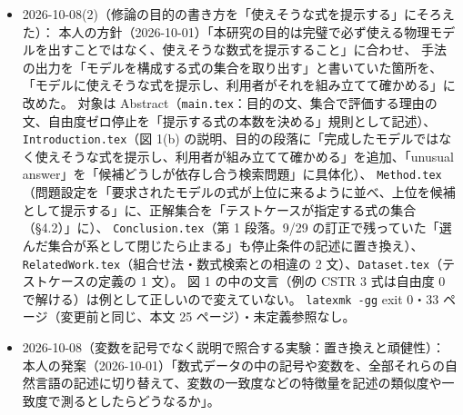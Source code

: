 \documentclass[11pt,a4paper]{jsarticle}
\begin{document}
\begin{itemize}[nosep]
    \S3.1 と表 1 の「必要な式を上位に並べる」$\to$「使える可能性の高い式を上位に並べる」、
    \S3.3 の「求めるのは……集めた式が連立方程式として解けること」$\to$「提示する式が変数でつながり、一緒にモデルに使えること」、
    表 1 の数式検索の行の「連立方程式として解ける式の集合を探す」$\to$「一緒に提示する式との変数のつながりも見て、モデルに使える可能性の高い式を探す」（自由度ゼロ停止は解ける集合を保証しないため）。
    \texttt{latexmk} exit 0・5 ページ（変更前と同じ）・未定義参照なし。配布用 PDF を更新し、Overleaf 用 zip \texttt{docs/seminar\_overleaf\_20261008\_related\_work.zip}
    （4 エントリ：\texttt{.tex}・\texttt{.bib}・\texttt{jresume.cls}・\texttt{latexmkrc}。10-08 の別報告の zip と名前がぶつからないよう報告名を付けた）を作り、展開し直して単体で exit 0・5 ページを確認した。
    作成中の \texttt{progress\_report\_2026-10-08\_var\_description.tex}（別セッションの作業、未追跡）は Abstract の同じ 1 文だけを書き換え、そのセッションに知らせた（コミットはそのセッションに任せる）。
    08-31 以前の報告は発表済みの記録として変えていない。
  \item 2026-10-08(2)（修論の目的の書き方を「使えそうな式を提示する」にそろえた）：
    本人の方針（2026-10-01）「本研究の目的は完璧で必ず使える物理モデルを出すことではなく、使えそうな数式を提示すること」に合わせ、
    手法の出力を「モデルを構成する式の集合を取り出す」と書いていた箇所を、「モデルに使えそうな式を提示し、利用者がそれを組み立てて確かめる」に改めた。
    対象は Abstract（\texttt{main.tex}：目的の文、集合で評価する理由の文、自由度ゼロ停止を「提示する式の本数を決める」規則として記述）、
    \texttt{Introduction.tex}（図 1(b) の説明、目的の段落に「完成したモデルではなく使えそうな式を提示し、利用者が組み立てて確かめる」を追加、「unusual answer」を「候補どうしが依存し合う検索問題」に具体化）、
    \texttt{Method.tex}（問題設定を「要求されたモデルの式が上位に来るように並べ、上位を候補として提示する」に、正解集合を「テストケースが指定する式の集合（\S4.2）」に）、
    \texttt{Conclusion.tex}（第 1 段落。9/29 の訂正で残っていた「選んだ集合が系として閉じたら止まる」も停止条件の記述に置き換え）、
    \texttt{RelatedWork.tex}（組合せ法・数式検索との相違の 2 文）、\texttt{Dataset.tex}（テストケースの定義の 1 文）。
    図 1 の中の文言（例の CSTR 3 式は自由度 0 で解ける）は例として正しいので変えていない。
    \texttt{latexmk -gg} exit 0・33 ページ（変更前と同じ、本文 25 ページ）・未定義参照なし。
  \item 2026-10-08（変数を記号でなく説明で照合する実験：置き換えと頑健性）：
    本人の発案（2026-10-01）「数式データの中の記号や変数を、全部それらの自然言語の記述に切り替えて、変数の一致度などの特徴量を記述の類似度や一致度で測るとしたらどうなるか」。

\end{itemize}
\end{document}
